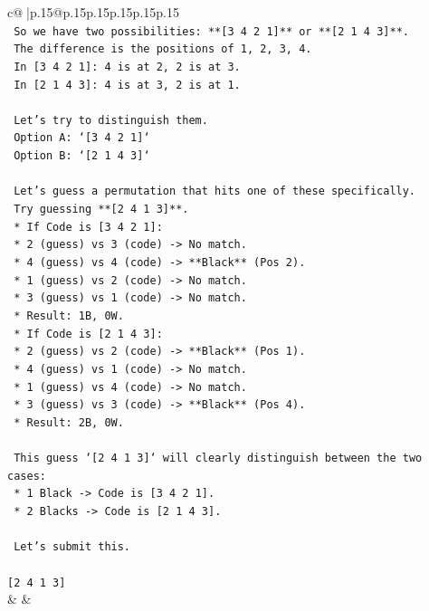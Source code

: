 \documentclass{article}
\begin{document}
{\begin{supertabular}{c@{$\;$}|p{.15\linewidth}@{}p{.15\linewidth}p{.15\linewidth}p{.15\linewidth}p{.15\linewidth}p{.15\linewidth}}
{{{\\ 
\texttt{    So we have two possibilities: **{[}3 4 2 1{]}** or **{[}2 1 4 3{]}**.} \\
\texttt{    The difference is the positions of 1, 2, 3, 4.} \\
\texttt{    In {[}3 4 2 1{]}: 4 is at 2, 2 is at 3.} \\
\texttt{    In {[}2 1 4 3{]}: 4 is at 3, 2 is at 1.} \\
\\ 
\texttt{    Let's try to distinguish them.} \\
\texttt{    Option A: `{[}3 4 2 1{]}`} \\
\texttt{    Option B: `{[}2 1 4 3{]}`} \\
\\ 
\texttt{    Let's guess a permutation that hits one of these specifically.} \\
\texttt{    Try guessing **{[}2 4 1 3{]}**.} \\
\texttt{    *   If Code is {[}3 4 2 1{]}:} \\
\texttt{        *   2 (guess) vs 3 (code) {-}> No match.} \\
\texttt{        *   4 (guess) vs 4 (code) {-}> **Black** (Pos 2).} \\
\texttt{        *   1 (guess) vs 2 (code) {-}> No match.} \\
\texttt{        *   3 (guess) vs 1 (code) {-}> No match.} \\
\texttt{        *   Result: 1B, 0W.} \\
\texttt{    *   If Code is {[}2 1 4 3{]}:} \\
\texttt{        *   2 (guess) vs 2 (code) {-}> **Black** (Pos 1).} \\
\texttt{        *   4 (guess) vs 1 (code) {-}> No match.} \\
\texttt{        *   1 (guess) vs 4 (code) {-}> No match.} \\
\texttt{        *   3 (guess) vs 3 (code) {-}> **Black** (Pos 4).} \\
\texttt{        *   Result: 2B, 0W.} \\
\\ 
\texttt{    This guess `{[}2 4 1 3{]}` will clearly distinguish between the two cases:} \\
\texttt{    *   1 Black {-}> Code is {[}3 4 2 1{]}.} \\
\texttt{    *   2 Blacks {-}> Code is {[}2 1 4 3{]}.} \\
\\ 
\texttt{    Let's submit this.} \\
\\ 
\texttt{{[}2 4 1 3{]}} \\
            }
        }
    }
    & & \\ \\


\end{supertabular}}
\end{document}
